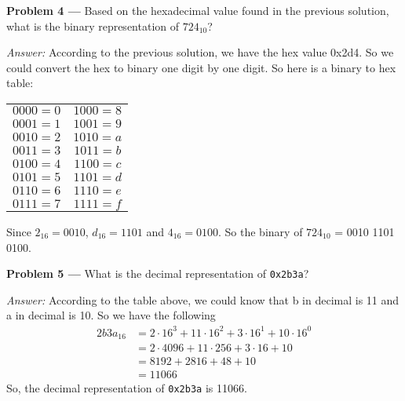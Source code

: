 \documentclass[11pt]{article}
\newcommand{\problem}[1]{\vspace*{2ex}\textbf{Problem #1 ---} }
\newcommand{\answer}{\textit{Answer: }}
\begin{document}
\problem{4} Based on the hexadecimal value found in the previous
solution, what is the binary representation of $724_{10}$?

\answer According to the previous solution, we have the hex value 0x2d4. So we could 
convert the hex to binary one digit by one digit. So here is a binary to hex table: 
\begin{center}
\begin{tabular}{|c|c|}
\hline
$0000 = 0$     &  $1000 = 8$\\
$0001 = 1$     &  $1001 = 9$\\
$0010 = 2$     &  $1010 = a$\\
$0011 = 3$     &  $1011 = b$\\
$0100 = 4$     &  $1100 = c$\\
$0101 = 5$     &  $1101 = d$\\
$0110 = 6$     &  $1110 = e$\\
$0111 = 7$     &  $1111 = f$\\  
\hline
\end{tabular}
\end{center}
Since $2_{16} = 0010$, $d_{16} = 1101$ and $4_{16} = 0100$. So the binary of 
$724_{10}$ = 0010 1101 0100.

\problem{5} What is the decimal representation of \texttt{0x2b3a}?

\answer According to the table above, we could know that b in decimal is 11 and a in 
decimal is 10. So we have the following
\begin{align*}
2b3a_{16} &= 2 \cdot 16^3 + 11 \cdot 16^2 + 3 \cdot 16^1 + 10 \cdot 16^0 \\
& = 2 \cdot 4096 + 11 \cdot 256 + 3\cdot 16 + 10 \\
& = 8192 + 2816 + 48 +10 \\
& = 11066
\end{align*}
So, the decimal representation of \texttt{0x2b3a} is 11066.
\end{document}
